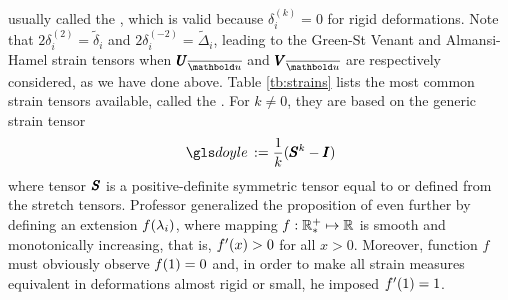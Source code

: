 usually called the , which is valid because $\delta_i^{(k)}=0$ for rigid deformations. Note that $2\delta_i^{(2)}=\tilde{\delta}_i$ and $2\delta_i^{(-2)}=\tilde{\Delta}_i$, leading to the Green-St Venant and Almansi-Hamel strain tensors when $\tnr{U}_{\overline{\vto{u}}}$ and $\tnr{V}_{\overline{\vto{u}}}$ are respectively considered, as we have done above. Table \ref{tb:strains} lists the most common strain tensors available, called the . For $k\neq 0$, they are based on the generic strain tensor 
\begin{equation}
\gloref{doyle}:=\dfrac{1}{k}(\tnr{S}^k-\tnr{I})
\end{equation}
where tensor $\pmb{S}$ is a positive-definite symmetric tensor equal to or defined from the stretch tensors. Professor \cite{hill_1968_1} generalized the proposition of \cite{seth_1961} even further by defining an extension $f(\lambda_i)$, where mapping $f : \mathbb{R}^+_* \mapsto \mathbb{R}$ is smooth and monotonically increasing, that is, $f'(x)>0$ for all $x>0$. Moreover, function $f$ must obviously observe $f(1)=0$ and, in order to make all strain measures equivalent in deformations almost rigid or small, he imposed $f'(1)=1$.

